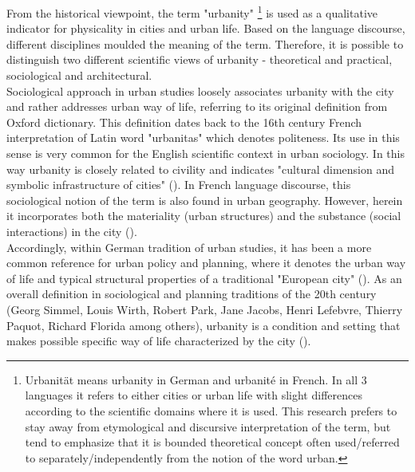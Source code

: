 \documentclass[11pt]{report}
\begin{document}
From the historical viewpoint, the term "urbanity"
\footnote{Urbanität means urbanity in German and urbanité in French. In all 3 languages it refers to either cities or urban life with slight differences according to the scientific domains where it is used.
This research prefers to stay away from etymological and discursive interpretation of the term, but tend to emphasize that it is bounded theoretical concept often used/referred to separately/independently from the notion of the word urban.}
is used as a qualitative indicator for physicality in cities and urban life. 
Based on the language discourse, different disciplines moulded the meaning of the term.
Therefore, it is possible to distinguish two different scientific views of urbanity - theoretical and practical, sociological and architectural.
\\

Sociological approach in urban studies loosely associates urbanity with the city and rather addresses urban way of life, referring to its original definition from Oxford dictionary.
This definition dates back to the 16th century French interpretation of Latin word "urbanitas" which denotes politeness.
Its use in this sense is very common for the English scientific context in urban sociology.
In this way urbanity is closely related to civility  and indicates "cultural dimension and symbolic infrastructure of cities" (\citealt{Zijderveld 2011}).
In French language discourse, this sociological notion of the term is also found in urban geography. However, herein it incorporates both the materiality (urban structures) and the substance (social interactions) in the city (\citealt{Bisson 2016}). 
\\

Accordingly, within German tradition of urban studies, it has been a more common reference for urban policy and planning, where it denotes the urban way of life and typical structural properties of a traditional "European city" (\citealt{(Prigge 1996, Wust 2005, Lossau 2008}). 
As an overall definition in sociological and planning traditions of the 20th century (Georg Simmel, Louis Wirth, Robert Park, Jane Jacobs, Henri Lefebvre, Thierry Paquot, Richard Florida among others), urbanity is a condition and setting that makes possible specific way of life characterized by the city (\cite{Lévy 2013}). 
\\
\end{document}
